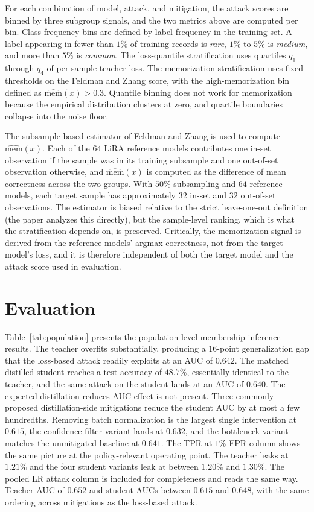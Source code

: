 \documentclass[conference]{IEEEtran}
\begin{document}
For each combination of model, attack, and mitigation, the attack scores are binned by three subgroup signals, and the two metrics above are computed per bin. Class-frequency bins are defined by label frequency in the training set. A label appearing in fewer than $1\%$ of training records is \emph{rare}, $1\%$ to $5\%$ is \emph{medium}, and more than $5\%$ is \emph{common}. The loss-quantile stratification uses quartiles $q_1$ through $q_4$ of per-sample teacher loss. The memorization stratification uses fixed thresholds on the Feldman and Zhang score, with the high-memorization bin defined as $\widehat{\mathrm{mem}}(x) > 0.3$. Quantile binning does not work for memorization because the empirical distribution clusters at zero, and quartile boundaries collapse into the noise floor.

The subsample-based estimator of Feldman and Zhang is used to compute $\widehat{\mathrm{mem}}(x)$. Each of the $64$ LiRA reference models contributes one in-set observation if the sample was in its training subsample and one out-of-set observation otherwise, and $\widehat{\mathrm{mem}}(x)$ is computed as the difference of mean correctness across the two groups. With $50\%$ subsampling and $64$ reference models, each target sample has approximately $32$ in-set and $32$ out-of-set observations. The estimator is biased relative to the strict leave-one-out definition (the paper analyzes this directly), but the sample-level ranking, which is what the stratification depends on, is preserved. Critically, the memorization signal is derived from the reference models' argmax correctness, not from the target model's loss, and it is therefore independent of both the target model and the attack score used in evaluation.

\section*{Evaluation}

Table~\ref{tab:population} presents the population-level membership inference results. The teacher overfits substantially, producing a $16$-point generalization gap that the loss-based attack readily exploits at an AUC of $0.642$. The matched distilled student reaches a test accuracy of $48.7\%$, essentially identical to the teacher, and the same attack on the student lands at an AUC of $0.640$. The expected distillation-reduces-AUC effect is not present. Three commonly-proposed distillation-side mitigations reduce the student AUC by at most a few hundredths. Removing batch normalization is the largest single intervention at $0.615$, the confidence-filter variant lands at $0.632$, and the bottleneck variant matches the unmitigated baseline at $0.641$. The TPR at $1\%$ FPR column shows the same picture at the policy-relevant operating point. The teacher leaks at $1.21\%$ and the four student variants leak at between $1.20\%$ and $1.30\%$. The pooled LR attack column is included for completeness and reads the same way. Teacher AUC of $0.652$ and student AUCs between $0.615$ and $0.648$, with the same ordering across mitigations as the loss-based attack.
\end{document}
